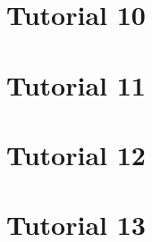 \documentclass[12pt]{article}
\begin{document}
\section{Tutorial 10}

\pagebreak

\section{Tutorial 11}

\pagebreak

\section{Tutorial 12}

\pagebreak

\section{Tutorial 13}

\pagebreak
\end{document}

